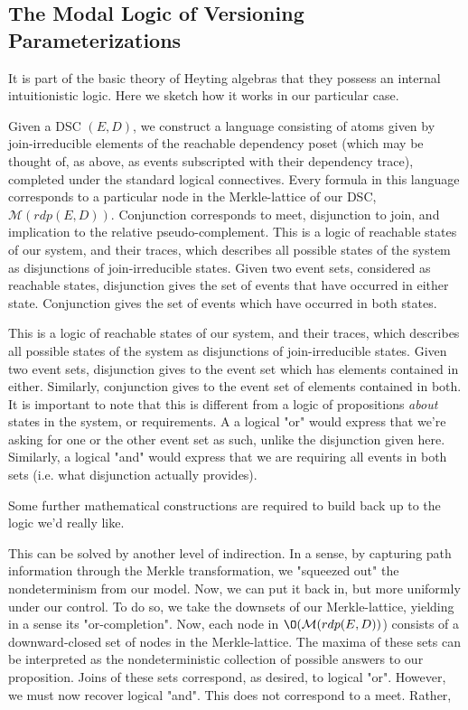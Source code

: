 \documentclass[hoptionsi,review,format=sigplan]{acmart}
\theoremstyle{definition}
\newcommand{\Mcc}{\mathcal{M}}
\begin{document}
\subsection{The Modal Logic of Versioning Parameterizations}
It is part of the basic theory of Heyting algebras that they possess an internal intuitionistic logic. Here we sketch how it works in our particular case.

Given a DSC \((E,D)\), we construct a language consisting of atoms given by join-irreducible elements of the reachable dependency poset (which may be thought of, as above, as events subscripted with their dependency trace), completed under the standard logical connectives. Every formula in this language corresponds to a particular node in the Merkle-lattice of our DSC, \(\Mcc(rdp(E,D))\).  Conjunction corresponds to meet, disjunction to join, and implication to the relative pseudo-complement. This is a logic of reachable states of our system, and their traces, which describes all possible states of the system as disjunctions of join-irreducible states. Given two event sets, considered as reachable states, disjunction gives the set of events that have occurred in either state. Conjunction gives the set of events which have occurred in both states.

This is a logic of reachable states of our system, and their traces, which describes all possible states of the system as disjunctions of join-irreducible states. Given two event sets, disjunction gives to the event set which has elements contained in either. Similarly, conjunction gives to the event set of elements contained in both.  It is important to note that this is different from a logic of propositions \textit{about} states in the system, or requirements. A a logical "or"  would express that we're asking for one or the other event set as such, unlike the disjunction given here. Similarly, a logical "and" would express that we are requiring all events in both sets (i.e. what disjunction actually provides).

Some further mathematical constructions are required to build back up to the logic we'd really like.



This can be solved by another level of indirection. In a sense, by capturing path information through the Merkle transformation, we "squeezed out" the nondeterminism from our model. Now, we can put it back in, but more uniformly under our control. To do so, we take the downsets of our Merkle-lattice, yielding in a sense its "or-completion". Now, each node in  \(\O(\Mcc(rdp(E,D))\)) consists of a downward-closed set of nodes in the Merkle-lattice. The maxima of these sets can be interpreted as the nondeterministic collection of possible answers to our proposition. Joins of these sets correspond, as desired, to logical "or". However, we must now recover logical "and". This does not correspond to a meet. Rather, 
\end{document}
